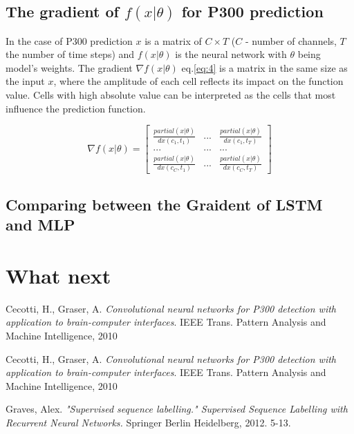\documentclass[]{report}
\begin{document}
\subsection{The gradient of $f(x|\theta)$ for P300 prediction}
In the case of P300 prediction $x$ is a matrix of $C\times{T}$ ($C$ - number of channels, $T$ the number of time steps) and $f(x|\theta)$ is the neural network with $\theta$ being model's weights. The gradient $\nabla{f(x|\theta)}$ eq.\ref{eq:4} is a matrix in the same size as the input $x$, where the amplitude of each cell reflects its impact on the function value. Cells with high absolute value can be interpreted as the cells that most influence the prediction function.

\begin{equation}\label{eq:4}
\nabla f\left( {x|\theta } \right) = \left[ {\begin{array}{*{20}{c}}
	{\frac{{partial\left( {x|\theta } \right)}}{{dx\left( {{c_1},{t_1}} \right)}}}&{...}&{\frac{{partial\left( {x|\theta } \right)}}{{dx\left( {{c_1},{t_T}} \right)}}}\\
	{...}&{...}&{...}\\
	{\frac{{partial\left( {x|\theta } \right)}}{{dx\left( {{c_C},{t_1}} \right)}}}&{...}&{\frac{{partial\left( {x|\theta } \right)}}{{dx\left( {{c_C},{t_T}} \right)}}}
	\end{array}} \right]
\end{equation}


\subsection{Comparing between the Graident of LSTM and MLP}













\section{What next}





\begin{thebibliography}{9}
	
	Cecotti, H., Graser, A.	
	\textit{Convolutional neural networks for P300 detection with application to brain-computer interfaces}. 
	IEEE Trans. Pattern Analysis and Machine Intelligence, 2010
	
	Cecotti, H., Graser, A.	
	\textit{Convolutional neural networks for P300 detection with application to brain-computer interfaces}. 
	IEEE Trans. Pattern Analysis and Machine Intelligence, 2010
	
	Graves, Alex.
	\textit{"Supervised sequence labelling." Supervised Sequence Labelling with Recurrent Neural Networks.} Springer Berlin Heidelberg, 2012. 5-13.
	
	
\end{thebibliography}
\end{document}
